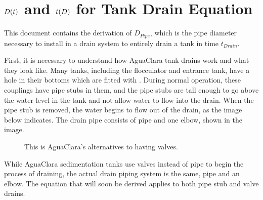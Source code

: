 \documentclass[letterpaper,10pt,english]{sphinxmanual}
\let\sphinxpxdimen\pdfpxdimen\else\newdimen\sphinxpxdimen
\begin{document}
\section{\protect\(D(t)\protect\) and \protect\(t(D)\protect\) for Tank Drain Equation}
\label{\detokenize{Flow_Control_and_Measurement/FCM_Derivations:and-for-tank-drain-equation}}\label{\detokenize{Flow_Control_and_Measurement/FCM_Derivations:diameter-and-time-tank-drain-equation}}
This document contains the derivation of \(D_{Pipe}\), which is the pipe diameter necessary to install in a drain system to entirely drain a tank in time \(t_{Drain}\).

First, it is necessary to understand how AguaClara tank drains work and what they look like. Many tanks, including the flocculator and entrance tank, have a hole in their bottoms which are fitted with . During normal operation, these couplings have pipe stubs in them, and the pipe stubs are tall enough to go above the water level in the tank and not allow water to flow into the drain. When the pipe stub is removed, the water begins to flow out of the drain, as the image below indicates. The drain pipe consists of pipe and one elbow, shown in the image.

\begin{figure}[htbp]
\centering
\capstart

\noindent\sphinxincludegraphics[width=600\sphinxpxdimen]{{pipe_stub_drainage}.png}
\caption{This is AguaClara’s alternatives to having valves.}\label{\detokenize{Flow_Control_and_Measurement/FCM_Derivations:id3}}\label{\detokenize{Flow_Control_and_Measurement/FCM_Derivations:pipe-stub-drainage}}\end{figure}

While AguaClara sedimentation tanks use valves instead of pipe to begin the process of draining, the actual drain piping system is the same, pipe and an elbow. The equation that will soon be derived applies to both pipe stub and valve drains.
\end{document}
